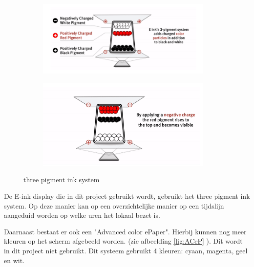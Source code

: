 \documentclass[a4paper,kul]{kulakarticle} %
\begin{document}
\begin{figure}[h]
	\centering
	\begin{subfigure}{.5\textwidth}
		\centering
		\includegraphics[width=0.95\textwidth]{three_pigment_ink_system1}
		\label{fig:sub3psystem}
	\end{subfigure}%
	\begin{subfigure}{.5\textwidth}
		\centering
		\includegraphics[width=0.95\textwidth]{three_pigment_ink_system2}
		\label{fig:sub3psystem2}
	\end{subfigure}
	\caption{three pigment ink system}
	\label{fig:3psystem}
\end{figure}

De E-ink display die in dit project gebruikt wordt, gebruikt het three pigment ink system. Op deze manier kan op een overzichtelijke manier op een tijdslijn aangeduid worden op welke uren het lokaal bezet is.
\newline

Daarnaast bestaat er ook een "Advanced color ePaper". Hierbij kunnen nog meer kleuren op het scherm afgebeeld worden. (zie afbeelding \ref{fig:ACeP} ). Dit wordt in dit project niet gebruikt. Dit systeem gebruikt 4 kleuren: cyaan, magenta, geel en wit.  \newline
\end{document}
